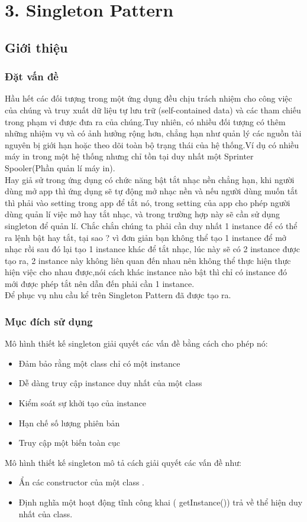\chapter{3. Singleton Pattern}

\section{Giới thiệu}
\subsection{Đặt vấn đề}
Hầu hết các đối tượng trong một ứng dụng đều chịu trách nhiệm cho công việc của chúng và truy xuất dữ liệu tự lưu trữ (self-contained data) và các tham chiếu trong phạm vi được đưa ra của chúng.Tuy nhiên, có nhiều đối tượng có thêm những nhiệm vụ và có ảnh hưởng rộng hơn, chẳng hạn như quản lý các nguồn tài nguyên bị giới hạn hoặc theo dõi toàn bộ trạng thái của hệ thống.Ví dụ có nhiều máy in trong một hệ thống nhưng chỉ tồn tại duy nhất một Sprinter Spooler(Phần quản lí máy in).\\
Hay giả sử trong ứng dụng có chức năng bật tắt nhạc nền chẳng hạn, khi người dùng mở app thì ứng dụng sẽ tự động mở nhạc nền và nếu người dùng muốn tắt thì phải vào setting trong app để tắt nó, trong setting của app cho phép người dùng quản lí việc mở hay tắt nhạc, và trong trường hợp này sẽ cần sử dụng singleton để quản lí. Chắc chắn chúng ta phải cần duy nhất 1 instance để có thể ra lệnh bật hay tắt, tại sao ? vì đơn giản bạn không thể tạo 1 instance để mở nhạc rồi sau đó lại tạo 1 instance khác để tắt nhạc, lúc này sẽ có 2 instance được tạo ra, 2 instance này không liên quan đến nhau nên không thể thực hiện thực hiện việc cho nhau được,nói cách khác instance nào bật thì chỉ có instance đó mới được phép tắt nên dẫn đến phải cần 1 instance.\\
Để phục vụ nhu cầu kể trên Singleton Pattern đã được tạo ra.
\subsection{Mục đích sử dụng}
Mô hình thiết kế singleton giải quyết các vấn đề bằng cách cho phép nó:
\begin{itemize}
    \item Đảm bảo rằng một class chỉ có một instance
    \item Dễ dàng truy cập instance duy nhất của một class
    \item Kiểm soát sự khởi tạo của instance
    \item Hạn chế số lượng phiên bản
    \item Truy cập một biến toàn cục
\end{itemize}
Mô hình thiết kế singleton mô tả cách giải quyết các vấn đề như:
\begin{itemize}
    \item Ẩn các constructor của một class .
    \item Định nghĩa một hoạt động tĩnh công khai ( getInstance()) trả về thể hiện duy nhất của class.
\end{itemize}

